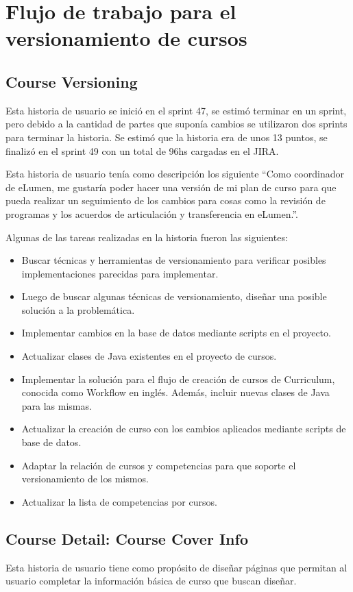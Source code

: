\section{Flujo de trabajo para el versionamiento de cursos}
\subsection{Course Versioning}
Esta historia de usuario se inició en el sprint 47, se estimó terminar en un sprint, pero debido a la cantidad de partes que suponía cambios se utilizaron dos sprints para terminar la historia. Se estimó que la historia era de unos 13 puntos, se finalizó en el sprint 49 con un total de 96hs cargadas en el JIRA.

Esta historia de usuario tenía como descripción los siguiente “Como coordinador de eLumen, me gustaría poder hacer una versión de mi plan de curso para que pueda realizar un seguimiento de los cambios para cosas como la revisión de programas y los acuerdos de articulación y transferencia en eLumen.”.

Algunas de las tareas realizadas en la historia fueron las siguientes:

\begin{itemize}
	\item Buscar técnicas y herramientas de versionamiento para verificar posibles implementaciones parecidas para implementar.
	\item Luego de buscar algunas técnicas de versionamiento, diseñar una posible solución a la problemática.
	\item Implementar cambios en la base de datos mediante scripts en el proyecto.
	\item Actualizar clases de Java existentes en el proyecto de cursos.
	\item Implementar la solución para el flujo de creación de cursos de Curriculum, conocida como Workflow en inglés. Además, incluir nuevas clases de Java para las mismas.
	\item Actualizar la creación de curso con los cambios aplicados mediante scripts de base de datos.
	\item Adaptar la relación de cursos y competencias para que soporte el versionamiento de los mismos.
	\item Actualizar la lista de competencias por cursos.
\end{itemize}

\subsection{Course Detail: Course Cover Info}
Esta historia de usuario tiene como propósito de diseñar páginas que permitan al usuario completar la información básica de curso que buscan diseñar.

